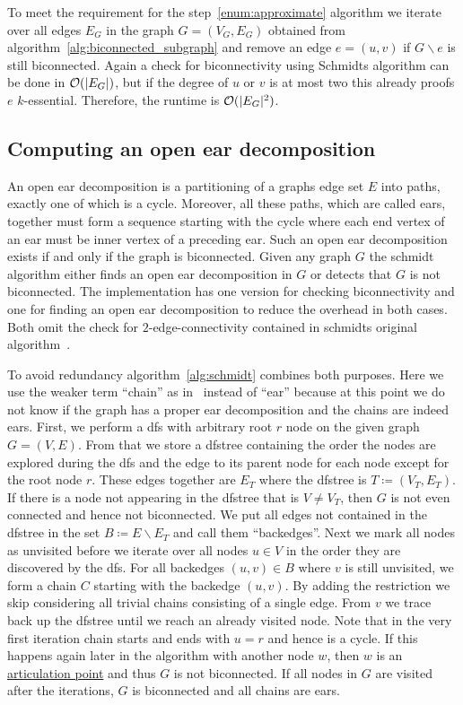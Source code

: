 To meet the requirement for the step~\ref{enum:approximate} algorithm we iterate over all edges \(E_G\) in the graph \(G = (V_G, E_G)\) obtained from algorithm~\ref{alg:biconnected_subgraph} and remove an edge \(e = (u, v)\) if \(G \backslash e\) is still biconnected. Again a check for biconnectivity using Schmidts algorithm can be done in \(\mathcal{O}(\vert E_G \vert)\), but if the degree of \(u\) or \(v\) is at most two this already proofs \(e\) \(k\)-essential. Therefore, the runtime is \(\mathcal{O}(\vert {E_G} \vert^2)\).

\subsection{Computing an open ear decomposition}\label{subsec:open_ear_decomposition}

An open ear decomposition is a partitioning of a graphs edge set \(E\) into paths, exactly one of which is a cycle. Moreover, all these paths, which are called ears, together must form a sequence starting with the cycle where each end vertex of an ear must be inner vertex of a preceding ear.
Such an open ear decomposition exists if and only if the graph is biconnected.
Given any graph \(G\) the schmidt algorithm either finds an open ear decomposition in \(G\) or detects that \(G\) is not biconnected. The implementation has one version for checking biconnectivity and one for finding an open ear decomposition to reduce the overhead in both cases. Both omit the check for \(2\)-edge-connectivity contained in schmidts original algorithm~\cite{schmidt2013}.

To avoid redundancy algorithm~\ref{alg:schmidt} combines both purposes. Here we use the weaker term \enquote{chain} as in~\cite{schmidt2013} instead of \enquote{ear} because at this point we do not know if the graph has a proper ear decomposition and the chains are indeed ears.
First, we perform a \gls{dfs} with arbitrary root \(r\) node on the given graph \(G = (V, E)\). From that we store a \gls{dfstree} containing the order the nodes are explored during the \gls{dfs} and the edge to its parent node for each node except for the root node \(r\). These edges together are \(E_T\) where the \gls{dfstree} is \(T \coloneqq (V_T, E_T)\).
If there is a node not appearing in the \gls{dfstree} that is \(V \neq V_T\), then \(G\) is not even connected and hence not biconnected.
We put all edges not contained in the \gls{dfstree} in the set \(B \coloneqq E \backslash E_T\) and call them \enquote{backedges}. Next we mark all nodes as unvisited before we iterate over all nodes \(u \in V\) in the order they are discovered by the \gls{dfs}.
For all backedges \((u,v) \in B\) where \(v\) is still unvisited, we form a chain \(C\) starting with the backedge \((u,v)\). By adding the restriction we skip considering all trivial chains consisting of a single edge. From \(v\) we trace back up the \gls{dfstree} until we reach an already visited node. Note that in the very first iteration chain starts and ends with \(u = r\) and hence is a cycle.
If this happens again later in the algorithm with another node \(w\), then \(w\) is an \hyperref[def:articulation_point]{articulation point} and thus \(G\) is not biconnected. If all nodes in \(G\) are visited after the iterations, \(G\) is biconnected and all chains are ears.

